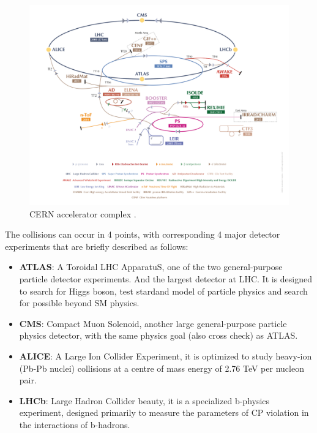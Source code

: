 \begin{figure}[!htb]
  \centering
  \includegraphics[width=1.0\textwidth]{figures/Detector/LHC_v2017.png}
  \caption{CERN accelerator complex \cite{Mobs:2197559}.}
  \label{cern_layout}
\end{figure}

The collisions can occur in 4 points, with corresponding 4 major detector experiments that are briefly described as follows:
\begin{itemize}
	\item \textbf{ATLAS}: A Toroidal LHC ApparatuS, one of the two general-purpose particle detector experiments. And the largest detector at LHC. It is designed to search for Higgs boson, test stardand model of particle physics and search for possible beyond SM physics.
	\item \textbf{CMS}: Compact Muon Solenoid, another large general-purpose particle physics detector, with the same physics goal (also cross check) as ATLAS.
	\item \textbf{ALICE}: A Large Ion Collider Experiment, it is optimized to study heavy-ion (Pb-Pb nuclei) collisions at a centre of mass energy of 2.76 TeV per nucleon pair.
	\item \textbf{LHCb}: Large Hadron Collider beauty, it is a specialized b-physics experiment, designed primarily to measure the parameters of CP violation in the interactions of b-hadrons.
\end{itemize}


